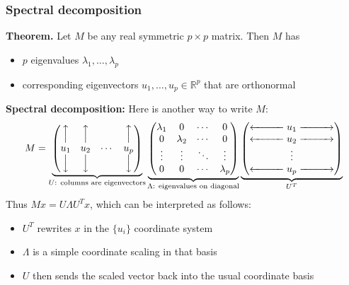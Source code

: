 \documentclass[smaller]{beamer}
\def\R{{\mathbb R}}
\def\darkred{\color{red!70!black}}
\def\v2{{\vskip.2in}}
\def\R{{\mathbb R}}
\begin{document}
\begin{frame}
\frametitle{Spectral decomposition}

{\bf Theorem.} Let $M$ be any real symmetric $p \times p$ matrix. Then $M$ has
\begin{itemize}
\item $p$ eigenvalues $\lambda_1, \ldots, \lambda_p$
\item corresponding eigenvectors $u_1, \ldots, u_p \in \R^p$ that are orthonormal
\end{itemize}

\pause\v2
{\darkred
{\bf Spectral decomposition:} Here is another way to write $M$:
$$ 
M = 
\underbrace{\begin{pmatrix}
\Big\uparrow   & \Big\uparrow   &         & \Big\uparrow \\
u_1            & u_2            &  \cdots & u_p  \\
\Big\downarrow & \Big\downarrow &         & \Big\downarrow
\end{pmatrix}}_{\text{$U$: columns are eigenvectors}}
\underbrace{\begin{pmatrix}
\lambda_1 &      0    & \cdots & 0      \\
0         & \lambda_2 & \cdots & 0      \\
\vdots    &   \vdots  & \ddots & \vdots \\
0         &     0     & \cdots & \lambda_p
\end{pmatrix}}_{\text{$\Lambda$: eigenvalues on diagonal}}
\underbrace{\begin{pmatrix} 
\xleftarrow{\hspace*{1cm}} u_1 \xrightarrow{\hspace*{1cm}} \\
\xleftarrow{\hspace*{1cm}} u_2 \xrightarrow{\hspace*{1cm}} \\
 \vdots \\ 
\xleftarrow{\hspace*{1cm}} u_p \xrightarrow{\hspace*{1cm}} 
\end{pmatrix}}_{U^T}
$$}
\pause
Thus $Mx = U\Lambda U^T x$, which can be interpreted as follows:
\begin{itemize}
\item $U^T$ rewrites $x$ in the $\{u_i\}$ coordinate system
\item $\Lambda$ is a simple coordinate scaling in that basis
\item $U$ then sends the scaled vector back into the usual coordinate basis
\end{itemize}
\end{frame}
\end{document}
